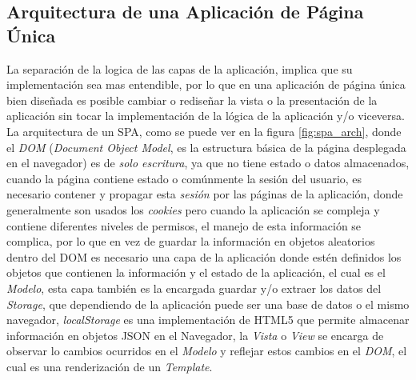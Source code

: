 



\subsection{Arquitectura de una Aplicación de Página Única}


La separación de la logica de las capas de la aplicación, implica que su implementación sea mas entendible, por lo que en una aplicación de página única bien diseñada es posible cambiar o rediseñar la vista o la presentación de la aplicación sin tocar la implementación de la lógica de la aplicación y/o viceversa.\\

La arquitectura de un SPA, como se puede ver en la figura \ref{fig:spa_arch}, donde el \emph{DOM} (\emph{Document Object Model}, es la estructura básica de la página desplegada en el navegador) es de \emph{solo escritura}, ya que no tiene estado o datos almacenados, cuando la página contiene estado o comúnmente la sesión del usuario, es necesario contener y propagar esta \emph{sesión} por las páginas de la aplicación, donde generalmente son usados los \emph{cookies} pero cuando la aplicación se compleja y contiene diferentes niveles de permisos, el manejo de esta información se complica, por lo que en vez de guardar la información en objetos aleatorios dentro del DOM es necesario una capa de la aplicación donde estén definidos los objetos que contienen la información y el estado de la aplicación, el cual es el \emph{Modelo}, esta capa también es la encargada guardar y/o extraer los datos del \emph{Storage}, que dependiendo de la aplicación puede ser una base de datos o el mismo navegador, \emph{localStorage} es una implementación de HTML5 que permite almacenar información en objetos JSON en el Navegador, la \emph{Vista} o \emph{View} se encarga de observar lo cambios ocurridos en el \emph{Modelo} y reflejar estos cambios en el \emph{DOM}, el cual es una renderización de un \emph{Template}.\\

